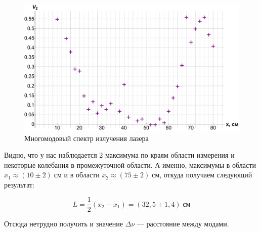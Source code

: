 \documentclass[12pt]{kiarticle}
\begin{document}
%
%



\begin{figure}[h!]
	\centering
	\includegraphics[width=0.9\linewidth]{V2.pdf}
	\caption{Многомодовый спектр излучения лазера}
	\label{V2}
\end{figure}

Видно, что у нас наблюдается 2 максимума по краям области измерения и некоторые колебания в промежуточной области. А именно, максимумы в области $ x_1 \approx (10 \pm 2) \; см $ и в области $ x_2 \approx (75 \pm 2) \; см $, откуда получаем следующий результат:

\begin{equation}\label{}
L = \dfrac{1}{2} (x_2 - x_1) = (32,5 \pm 1,4) \; см
\end{equation}

Отсюда нетрудно получить и значение $ \Delta \nu $ --- расстояние между модами. 
\end{document}

